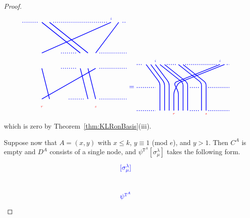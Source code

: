 \documentclass[twoside,11pt,reqno,letter]{amsart}
\numberwithin{equation}{section}
\theoremstyle{definition}  %
\newcommand{\0}{{\bar 0}}
\newcommand{\1}{{\bar 1}}
\newcommand{\la}{\lambda}
\newcommand{\si}{\sigma}
\def\T{{\mathtt T}}
\newenvironment{braid}{%
  \begin{tikzpicture}[baseline=6mm,blue,line width=1pt, scale=0.4,
                      draw/.append style={rounded corners},
                      every node/.append style={font=\tiny}]%
  }{\end{tikzpicture}
}
\begin{document}
{\begin{proof}
\[\begin{braid}
    \draw[dotted](3.5,10)--(5.5,10);
    \draw[dotted](8.5,6)--(10.5,6);
    \draw[dotted](8.5,4)--(10.5,4);
    \draw[dotted](9.5,0)--(11.5,0);

    \draw(6,10)--(11,6); \draw(11,4)--(12,0);
    \draw(7,10)--(12,6); \draw(12,4)--(13,0);  \draw(13,-1)node[color=red]{$s$};

    \draw[dotted](7.5,10)--(14.5,10);

    \draw(15,10)node[above]{$i$}--(6,6); \draw(6,4)--(7,0);
    \draw(16,10)--(13,6); \draw(13,4)--(6,0); \draw(6,-1)node[color=red]{$r$};

    \draw[dotted](16.5,10)--(17,10);
    \draw[dotted](13.5,6)--(17,6);
    \draw[dotted](13.5,4)--(17,4);
    \draw[dotted](13.5,0)--(17,0);
  \end{braid}
  \begin{braid}\tikzset{scale=0.6,baseline=12mm}
    \draw(0,5)node[font=\normalsize]{$=$};
  \end{braid}
  \begin{braid}\tikzset{scale=0.6,baseline=12mm}
    \draw[dotted](-1,10)--(0,10);
    \draw[dotted](-1,5)--(3,5);
    \draw[dotted](-1,0)--(3,0);

    \draw(1,10)--(4,6)--(4,4)--(4,0);
    \draw(2,10)--(5,6)--(5,4)--(5,0);
    \draw(3,10)node[above]{$i$}--(6,6)--(6,4)--(6,0);
    \draw(4,10)--(9,6)--(9,4)--(9,0);
    \draw(5,10)--(10,6)--(10,4)--(10,0);

    \draw[dotted](5.5,10)--(7.5,10);
    \draw[dotted](10.5,5)--(12.5,5);
    \draw[dotted](10.5,0)--(12.5,0);

    \draw(8,10)--(13,6)--(13,4)--(13,0);
    \draw(9,10)--(14,6)--(14,4)--(14,0)node[below, color=red]{$s$};

    \draw[dotted](9.5,10)--(16.5,10);

    \draw(17,10)node[above]{$i$}--(7,6)--(8,4)--(8,0);
    \draw(18,10)--(8,6)--(7,4)--(7,0)node[below, color=red]{$r$};

    \draw[dotted](18.5,10)--(19,10);
    \draw[dotted](14.5,5)--(19,5);
    \draw[dotted](14.5,0)--(19,0);
  \end{braid}
\]
which is zero by Theorem~\ref{thm:KLRonBasis}(iii).





  Suppose now that $A =(x,y)$ with $x \leq k$, $y \equiv 1$ (mod $e$), and $y > 1$. Then $C^A$ is empty and $D^A$ consists of a single node, and $\psi^{\T^A} [\si^\la_\mu]$ takes the following form.
\[
  \begin{braid}\tikzset{scale=0.6,baseline=12mm}
    \draw(0,8)node[left,font=\normalsize]{$[\si^\la_\mu]$};
    \draw(0,2)node[left,font=\normalsize]{$\psi^{\T^A}$};


\end{braid}\]
\end{proof}}
\end{document}
